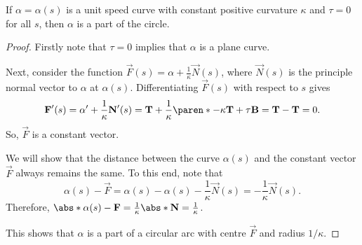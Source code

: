 \documentclass[11pt]{penrose}
\newcommand{\vT}{\vec{T}}
\newcommand{\vN}{\vec{N}}
\newcommand{\vB}{\vec{B}}
\begin{document}

\begin{nthm}
    If $\alpha = \alpha(s)$ is a unit speed curve with constant positive curvature $\kappa$ and $\tau = 0$ for all $s$, then $\alpha$ is a part of the circle.
\end{nthm}
\begin{proof}
    Firstly note that $\tau = 0$ implies that $\alpha$ is a plane curve.

    Next, consider the function $\vec{F}(s) = \alpha + \frac{1}{\kappa} \vN(s)$,
    where $\vN(s)$ is the principle normal vector to $\alpha$ at $\alpha(s)$. Differentiating $\vec{F}(s)$ with respect to $s$ gives
    \begin{equation}
        \vec{F}'(s)
        = \alpha' + \frac{1}{\kappa} \vN'(s)
        = \vT + \frac{1}{\kappa} \paren*{-\kappa \vT + \tau \vB}
        = \vT - \vT
        = 0.
    \end{equation}
    So, $\vec{F}$ is a constant vector.

    We will show that the distance between the curve $\alpha(s)$ and the constant vector $\vec{F}$ always remains the same. To this end, note that
    \begin{equation}
        \alpha(s) - \vec{F}
        = \alpha(s) - \alpha(s) - \frac{1}{\kappa} \vN(s)
        = -\frac{1}{\kappa} \vN(s).
    \end{equation}
    Therefore, $\abs*{\alpha(s) - \vec{F}} = \frac{1}{\kappa} \abs*{\vN} = \frac{1}{\kappa}$.

    This shows that $\alpha$ is a part of a circular arc with centre $\vec{F}$ and radius $1/\kappa$.
\end{proof}
\end{document}
